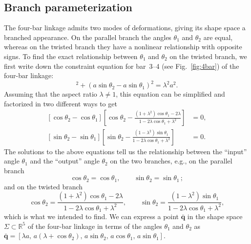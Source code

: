 \subsection{Branch parameterization}

The four-bar linkage admits two modes of deformations, giving its shape space a branched appearance.
On the parallel branch the angles $\theta_{1}$ and $\theta_{2}$ are equal, whereas on the twisted branch they have a nonlinear relationship with opposite signs.
To find the exact relationship between $\theta_{1}$ and $\theta_{2}$ on the twisted branch, we first write down the constraint equation for bar~3--4 (see Fig.~\ref{fig:4bar}) of the four-bar linkage:
%
\begin{equation}
  [\lambda a + a(\cos{\theta_2} - \cos{\theta_1})]^2 + (a\sin{\theta_2} - a\sin{\theta_1})^2 = \lambda^2 a^2.
\end{equation}
%
Assuming that the aspect ratio $\lambda \ne 1$, this equation can be simplified and factorized in two different ways to get
%
\begin{subequations}
\begin{align}
  \left[\cos{\theta_2} - \cos{\theta_1}\right]\left[\cos{\theta_2} - \frac{(1 + \lambda^2)\cos{\theta_1} - 2\lambda}{1 - 2\lambda\cos{\theta_1} + \lambda^2}\right] &= 0,\\
  \left[\sin{\theta_2} - \sin{\theta_1}\right]\left[\sin{\theta_2} - \frac{(1 - \lambda^2)\sin{\theta_1}}{1 -2\lambda\cos{\theta_1} + \lambda^2}\right] &= 0.
\end{align}
\end{subequations}
%
The solutions to the above equations tell us the relationship between the ``input'' angle $\theta_1$ and the ``output'' angle $\theta_2$ on the two branches, e.g., on the parallel branch
%
\begin{equation}
  \cos\theta_2 = \cos\theta_1,\qquad
  \sin\theta_2 = \sin\theta_1\,;
  \label{eq:parallel}
\end{equation}
%
and on the twisted branch
%
\begin{equation}
  \cos\theta_2 = \frac{(1 + \lambda^2)\cos{\theta_1} - 2\lambda}{1 - 2\lambda\cos{\theta_1} + \lambda^2}, \qquad
  \sin\theta_2 = \frac{(1 - \lambda^2)\sin{\theta_1}}{1 - 2\lambda\cos{\theta_1} + \lambda^2},
  \label{eq:twisted}
\end{equation}
%
which is what we intended to find.
We can express a point $\bar{\bm{q}}$ in the shape space $\Sigma \subset \mathbb{R}^5$ of the four-bar linkage in terms of the angles $\theta_1$ and $\theta_2$ as $\bar{\bm{q}} = [\lambda a,\, a(\lambda + \cos{\theta_2}),\, a\sin{\theta_2},\, a\cos{\theta_1},\, a\sin{\theta_1}]$.
